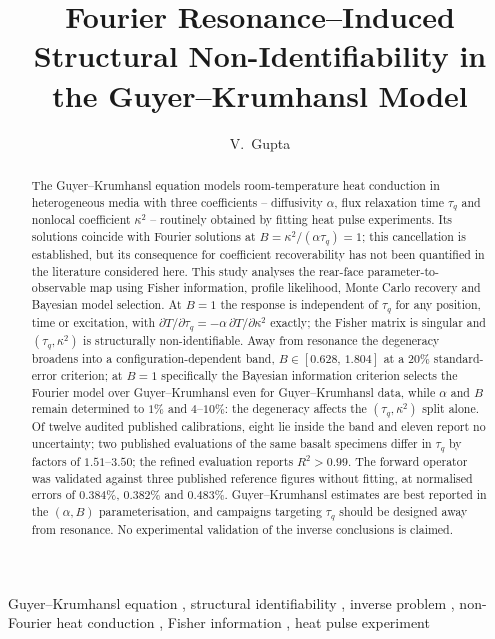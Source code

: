 \documentclass[preprint,12pt,a4paper]{elsarticle}
\theoremstyle{plain}
\theoremstyle{definition}
\theoremstyle{remark}
\begin{document}
\begin{frontmatter}

\title{Fourier Resonance--Induced Structural Non-Identifiability in the Guyer--Krumhansl Model}

\author{V.~Gupta}
\address{Department of Mathematics, Gurugram University,
         Gurugram, Haryana, India}

\begin{abstract}
The Guyer--Krumhansl equation models room-temperature heat conduction in
heterogeneous media with three coefficients -- diffusivity $\alpha$, flux
relaxation time $\tau_{q}$ and nonlocal coefficient $\kappa^{2}$ -- routinely
obtained by fitting heat pulse experiments. Its solutions coincide with
Fourier solutions at $B = \kappa^{2}/(\alpha\tau_{q}) = 1$; this cancellation
is established, but its consequence for coefficient recoverability has not been
quantified in the literature considered here. This study analyses the rear-face parameter-to-observable map
using Fisher information, profile likelihood, Monte Carlo recovery and
Bayesian model selection. At $B=1$ the response is independent of $\tau_{q}$
for any position, time or excitation, with $\partial T/\partial\tau_{q} =
-\alpha\,\partial T/\partial\kappa^{2}$ exactly; the Fisher matrix is singular
and $(\tau_{q},\kappa^{2})$ is structurally non-identifiable. Away from
resonance the degeneracy broadens into a configuration-dependent band,
$B \in [0.628,\,1.804]$ at a $20\%$ standard-error criterion; at $B=1$
specifically the Bayesian information criterion selects the Fourier model over
Guyer--Krumhansl even for Guyer--Krumhansl data, while $\alpha$ and $B$ remain
determined to $1\%$ and $4$--$10\%$: the degeneracy affects the
$(\tau_{q},\kappa^{2})$ split alone. Of twelve audited published calibrations,
eight lie inside the band and eleven report no uncertainty; two published evaluations of
the same basalt specimens differ in $\tau_{q}$ by factors of $1.51$--$3.50$;
the refined evaluation reports $R^{2}>0.99$. The forward
operator was validated against three published reference figures without
fitting, at normalised errors of $0.384\%$, $0.382\%$ and $0.483\%$.
Guyer--Krumhansl estimates are best reported in the $(\alpha,B)$
parameterisation, and campaigns targeting $\tau_{q}$ should be designed away
from resonance. No experimental validation of the inverse conclusions is
claimed.
\end{abstract}

\begin{keyword}
Guyer--Krumhansl equation \sep
structural identifiability \sep
inverse problem \sep
non-Fourier heat conduction \sep
Fisher information \sep
heat pulse experiment
\end{keyword}

\end{frontmatter}
\end{document}
